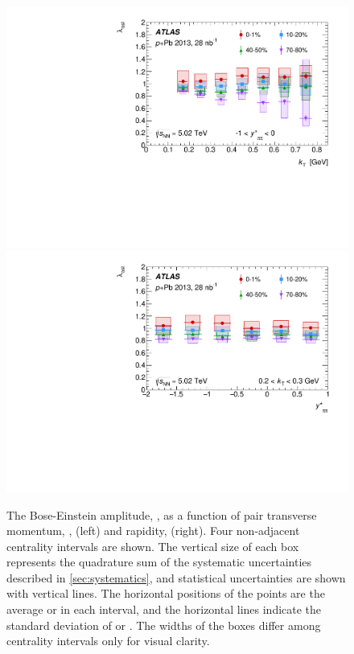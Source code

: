 \begin{figure}[t]
\centering
\includegraphics[width=0.49\linewidth]{canqosl_x_vs_kt.pdf}
\includegraphics[width=0.49\linewidth]{canqosl_x_vs_kys.pdf}
\caption{The Bose-Einstein amplitude, \losl, as a function of pair transverse momentum, \kt, (left) and rapidity, \kys (right). Four non-adjacent centrality intervals are shown. The vertical size of each box represents the quadrature sum of the systematic uncertainties described in \cref{sec:systematics}, and statistical uncertainties are shown with vertical lines. The horizontal positions of the points are the average \kt or \kys in each interval, and the horizontal lines indicate the standard deviation of \kt or \kys. The widths of the boxes differ among centrality intervals only for visual clarity.}
\label{fig:results_qosl_x}
\end{figure}


